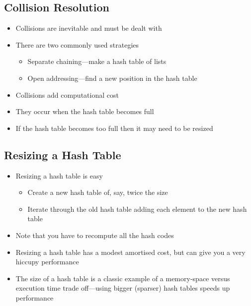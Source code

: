 \Outline %

\begin{slide}
\section{Collision Resolution}

\begin{PauseHighLight}
  \begin{itemize}
  \item Collisions are inevitable and must be dealt with\pause
  \item There are two commonly used strategies\pause
    \begin{itemize}
    \item Separate chaining---make a hash table of lists\pause
    \item Open addressing---find a new position in the hash table\pause
    \end{itemize}
  \item Collisions add computational cost\pause
  \item They occur when the hash table becomes full\pause
  \item If the hash table becomes too full then it may need to be
    resized\pause
  \end{itemize}
\end{PauseHighLight}

\end{slide}


\begin{slide}
\section[-1]{Resizing a Hash Table}

\begin{PauseHighLight}
  \begin{itemize}
  \item Resizing a hash table is easy\pause
    \begin{itemize}
    \item Create a new hash table of, say, twice the size\pause
    \item Iterate through the old hash table adding each element to the
      new hash table\pause
    \end{itemize}
  \item Note that you have to recompute all the hash codes\pause
  \item Resizing a hash table has a modest amortised cost, but can give
    you a very hiccupy performance\pause
  \item The size of a hash table is a classic example of a memory-space
    versus execution time trade off\pause---using bigger (sparser) hash
    tables speeds up performance\pause
  \end{itemize}
\end{PauseHighLight}

\end{slide}


